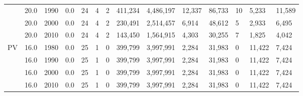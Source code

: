 \documentclass[sigconf]{acmart}
\begin{document}
\begin{table}[]
\begin{tabular}{|l|l|l|l|l|l|l|l|l|l|l|l|l|l|}
		& 20.0 & 1990 & 0.0 & 24 & 4 & 2 & 411,234 & 4,486,197 & 12,337 & 86,733 & 10 & 5,233 & 11,589 \\ \cline{2-14} 
		& 20.0 & 2000 & 0.0 & 24 & 4 & 2 & 230,491 & 2,514,457 & 6,914 & 48,612 & 5 & 2,933 & 6,495 \\ \cline{2-14} 
		& 20.0 & 2010 & 0.0 & 24 & 4 & 2 & 143,450 & 1,564,915 & 4,303 & 30,255 & 7 & 1,825 & 4,042 \\ \hline
		\multirow{4}{*}{PV} & 16.0 & 1980 & 0.0 & 25 & 1 & 0 & 399,799 & 3,997,991 & 2,284 & 31,983 & 0 & 11,422 & 7,424 \\ \cline{2-14} 
		& 16.0 & 1990 & 0.0 & 25 & 1 & 0 & 399,799 & 3,997,991 & 2,284 & 31,983 & 0 & 11,422 & 7,424 \\ \cline{2-14} 
		& 16.0 & 2000 & 0.0 & 25 & 1 & 0 & 399,799 & 3,997,991 & 2,284 & 31,983 & 0 & 11,422 & 7,424 \\ \cline{2-14} 
		& 16.0 & 2010 & 0.0 & 25 & 1 & 0 & 399,799 & 3,997,991 & 2,284 & 31,983 & 0 & 11,422 & 7,424 \\ \hline
	\end{tabular}
\end{table}
\end{document}
